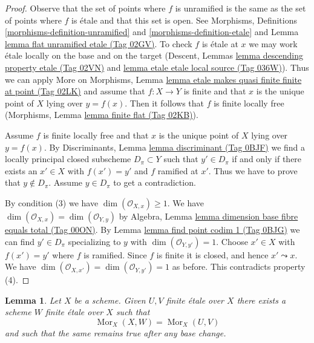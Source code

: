 \documentclass{amsart}
\theoremstyle{plain}
\newtheorem{lemma}[subsection]{Lemma}
\theoremstyle{definition}
\theoremstyle{remark}
\numberwithin{equation}{subsection}
\def\Mor{\mathop{\mathrm{Mor}}\nolimits}
\begin{document}
\begin{proof}
Observe that the set of points where $f$ is unramified is the same as
the set of points where $f$ is \'etale and that this set is open.
See Morphisms, Definitions \ref{morphisms-definition-unramified}
and \ref{morphisms-definition-etale} and
Lemma \href{https://stacks.math.columbia.edu/tag/02GV}{lemma flat unramified etale (Tag 02GV)}.
To check $f$ is \'etale at $x$ we may work \'etale
locally on the base and on the
target (Descent, Lemmas \href{https://stacks.math.columbia.edu/tag/02VN}{lemma descending property etale (Tag 02VN)} and
\href{https://stacks.math.columbia.edu/tag/036W}{lemma etale etale local source (Tag 036W)}).
Thus we can apply More on Morphisms, Lemma
\href{https://stacks.math.columbia.edu/tag/02LK}{lemma etale makes quasi finite finite at point (Tag 02LK)}
and assume that $f : X \to Y$ is finite and that $x$ is the unique
point of $X$ lying over $y = f(x)$.
Then it follows that $f$ is finite locally free
(Morphisms, Lemma \href{https://stacks.math.columbia.edu/tag/02KB}{lemma finite flat (Tag 02KB)}).

\medskip\noindent
Assume $f$ is finite locally free and that $x$ is the unique point of
$X$ lying over $y = f(x)$. By
Discriminants, Lemma \href{https://stacks.math.columbia.edu/tag/0BJF}{lemma discriminant (Tag 0BJF)}
we find a locally principal closed subscheme $D_\pi \subset Y$
such that $y' \in D_\pi$ if and only if there exists an $x' \in X$
with $f(x') = y'$ and $f$ ramified at $x'$. Thus we have to prove
that $y \not \in D_\pi$. Assume $y \in D_\pi$ to get a contradiction.

\medskip\noindent
By condition (3) we have $\dim(\mathcal{O}_{X, x}) \geq 1$.
We have $\dim(\mathcal{O}_{X, x}) = \dim(\mathcal{O}_{Y, y})$ by
Algebra, Lemma \href{https://stacks.math.columbia.edu/tag/00ON}{lemma dimension base fibre equals total (Tag 00ON)}.
By Lemma \href{https://stacks.math.columbia.edu/tag/0BJG}{lemma find point codim 1 (Tag 0BJG)}
we can find $y' \in D_\pi$ specializing to $y$
with $\dim(\mathcal{O}_{Y, y'}) = 1$.
Choose $x' \in X$ with $f(x') = y'$ where $f$ is ramified. Since $f$
is finite it is closed, and hence $x' \leadsto x$.
We have $\dim(\mathcal{O}_{X, x'}) = \dim(\mathcal{O}_{Y, y'}) = 1$
as before. This contradicts property (4).
\end{proof}


\begin{lemma}
\label{lemma-internal-hom-finite-etale}
Let $X$ be a scheme. Given $U, V$ finite \'etale over $X$ there
exists a scheme $W$ finite \'etale over $X$ such that
$$
\Mor_X(X, W) = \Mor_X(U, V)
$$
and such that the same remains true after any base change.
\end{lemma}
\end{document}
